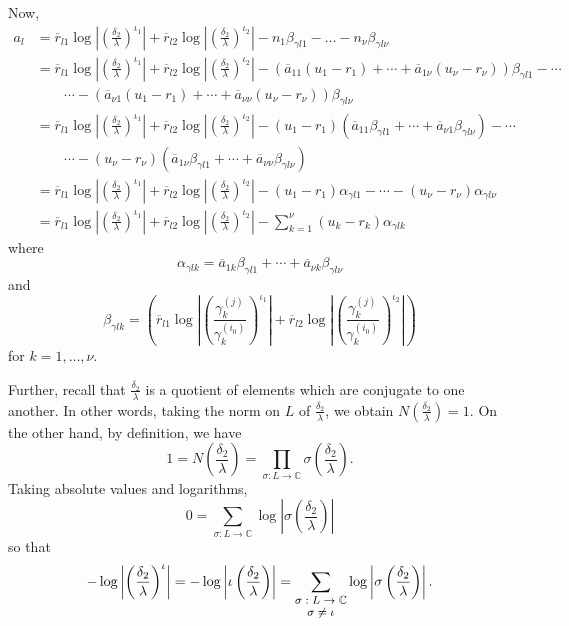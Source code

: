 Now, 
\begin{align*}
a_l 	& = \overline{r}_{l1}\log\left|\left(\frac{\delta_2}{\lambda}\right)^{\iota_1}\right| + \overline{r}_{l2}\log\left|\left(\frac{\delta_2}{\lambda}\right)^{\iota_2}\right| - n_1\beta_{\gamma l 1} - \dots - n_{\nu}\beta_{\gamma l \nu}\\
	& = \overline{r}_{l1}\log\left|\left(\frac{\delta_2}{\lambda}\right)^{\iota_1}\right| + \overline{r}_{l2}\log\left|\left(\frac{\delta_2}{\lambda}\right)^{\iota_2}\right| - \left(\overline{a}_{11}(u_1-r_1) + \cdots + \overline{a}_{1\nu}(u_{\nu}-r_{\nu})\right)\beta_{\gamma l 1} - \cdots \\
	&  \quad \quad \cdots - (\overline{a}_{\nu 1}(u_1-r_1) + \cdots + \overline{a}_{\nu \nu}(u_{\nu}-r_{\nu}))\beta_{\gamma l \nu} \\
	& = \overline{r}_{l1}\log\left|\left(\frac{\delta_2}{\lambda}\right)^{\iota_1}\right| + \overline{r}_{l2}\log\left|\left(\frac{\delta_2}{\lambda}\right)^{\iota_2}\right| -(u_1-r_1)(\overline{a}_{11}\beta_{\gamma l 1} + \cdots + \overline{a}_{\nu 1}\beta_{\gamma l \nu}) - \cdots\\
	& \quad \quad \cdots - (u_{\nu}-r_{\nu})\left(\overline{a}_{1\nu}\beta_{\gamma l 1} + \cdots + \overline{a}_{\nu \nu}\beta_{\gamma l \nu}\right)\\
	& = \overline{r}_{l1}\log\left|\left(\frac{\delta_2}{\lambda}\right)^{\iota_1}\right| + \overline{r}_{l2}\log\left|\left(\frac{\delta_2}{\lambda}\right)^{\iota_2}\right| - (u_1-r_1)\alpha_{\gamma l 1} - \cdots - (u_{\nu} - r_{\nu})\alpha_{\gamma l \nu}\\
	& = \overline{r}_{l1}\log\left|\left(\frac{\delta_2}{\lambda}\right)^{\iota_1}\right| + \overline{r}_{l2}\log\left|\left(\frac{\delta_2}{\lambda}\right)^{\iota_2}\right| - \sum_{k=1}^{\nu}(u_k-r_k)\alpha_{\gamma l k}
\end{align*}
where
\[\alpha_{\gamma l k} = \overline{a}_{1k}\beta_{\gamma l 1} + \cdots + \overline{a}_{\nu k}\beta_{\gamma l \nu}\]
and
\[\beta_{\gamma l k} = \left(\overline{r}_{l1} \log\left| \left( \frac{\gamma_k^{(j)}}{\gamma_k^{(i_0)}}\right)^{\iota_1}\right|+ \overline{r}_{l2}\log\left| \left( \frac{\gamma_k^{(j)}}{\gamma_k^{(i_0)}}\right)^{\iota_2}\right|\right)\]
for $k = 1, \dots, \nu$.

Further, recall that $\frac{\delta_2}{\lambda}$ is a quotient of elements which are conjugate to one another. In other words, taking the norm on $L$ of $\frac{\delta_2}{\lambda}$, we obtain $N\left(\frac{\delta_2}{\lambda}\right) = 1.$ On the other hand, by definition, we have 
\[1 = N\left(\frac{\delta_2}{\lambda}\right) = \prod_{\sigma: L \to \mathbb{C}} \sigma \left(\frac{\delta_2}{\lambda}\right).\]
Taking absolute values and logarithms, 
\[0 = \sum_{\sigma: L \to \mathbb{C}} \log\left|\sigma \left(\frac{\delta_2}{\lambda}\right)\right|\]
so that
\[-\log\left|\left(\frac{\delta_2}{\lambda}\right)^{\iota}\right| = -\log\left|\iota \left(\frac{\delta_2}{\lambda}\right)\right| = \sum_{\shortstack{\footnotesize $\sigma: L \to \mathbb{C} $\\ \footnotesize $ \sigma \neq \iota$}} \log\left|\sigma \left(\frac{\delta_2}{\lambda}\right)\right|.\]

